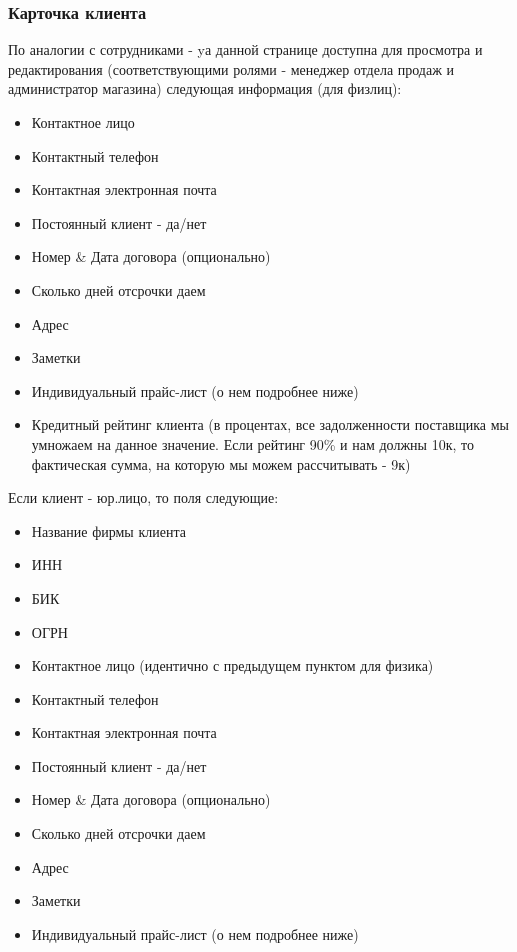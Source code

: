 \documentclass[DIV=calc, paper=a4, fontsize=11pt]{scrartcl} %
\begin{document}
\subsubsection{Карточка клиента}

По аналогии с сотрудниками - yа данной странице доступна для просмотра и редактирования (соответствующими ролями - менеджер отдела продаж и администратор магазина) следующая информация (для физлиц): 

\begin{itemize}
	\item Контактное лицо
	\item Контактный телефон
	\item Контактная электронная почта
	\item Постоянный клиент - да/нет
	\item Номер \& Дата договора (опционально)
	\item Сколько дней отсрочки даем
	\item Адрес 
	\item Заметки
	\item Индивидуальный прайс-лист (о нем подробнее ниже)
	\item Кредитный рейтинг клиента (в процентах, все задолженности поставщика мы умножаем на данное значение. Если рейтинг 90\% и нам должны 10к, то фактическая сумма, на которую мы можем рассчитывать - 9к)
\end{itemize}

Если клиент - юр.лицо, то поля следующие:

\begin{itemize}
	\item Название фирмы клиента
	\item ИНН
	\item БИК
	\item ОГРН
	\item Контактное лицо (идентично с предыдущем пунктом для физика)
	\item Контактный телефон
	\item Контактная электронная почта
	\item Постоянный клиент - да/нет
	\item Номер \& Дата договора (опционально)
	\item Сколько дней отсрочки даем
	\item Адрес 
	\item Заметки
	\item Индивидуальный прайс-лист (о нем подробнее ниже)
\end{itemize}
\end{document}
